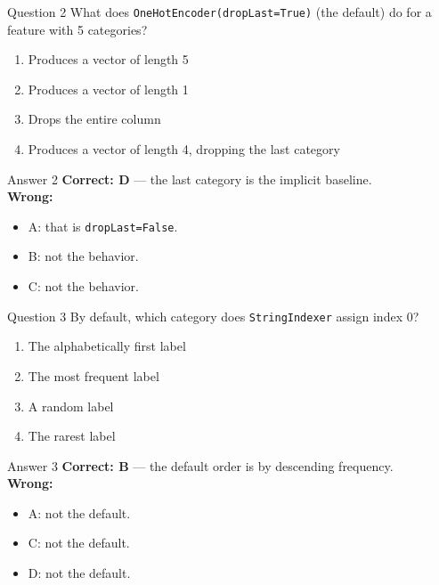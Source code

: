\documentclass[aspectratio=169,11pt]{beamer}
\begin{document}
\begin{frame}{Question 2}
What does \texttt{OneHotEncoder(dropLast=True)} (the default) do for a feature with 5 categories?
\begin{enumerate}[label=\Alph*.]
\item Produces a vector of length 5
\item Produces a vector of length 1
\item Drops the entire column
\item Produces a vector of length 4, dropping the last category
\end{enumerate}
\end{frame}
\begin{frame}{Answer 2}
\textbf{Correct: D} --- the last category is the implicit baseline.\\
\vspace{0.5em}
\textbf{Wrong:}
\begin{itemize}
\item A: that is \texttt{dropLast=False}.
\item B: not the behavior.
\item C: not the behavior.
\end{itemize}
\end{frame}

\begin{frame}{Question 3}
By default, which category does \texttt{StringIndexer} assign index 0?
\begin{enumerate}[label=\Alph*.]
\item The alphabetically first label
\item The most frequent label
\item A random label
\item The rarest label
\end{enumerate}
\end{frame}
\begin{frame}{Answer 3}
\textbf{Correct: B} --- the default order is by descending frequency.\\
\vspace{0.5em}
\textbf{Wrong:}
\begin{itemize}
\item A: not the default.
\item C: not the default.
\item D: not the default.
\end{itemize}
\end{frame}
\end{document}
